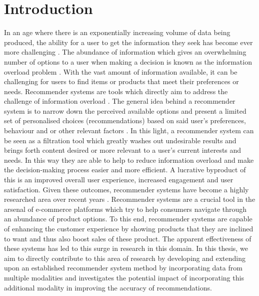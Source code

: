 
\chapter{Introduction} %

\label{Chapter1} %


\newcommand{\keyword}[1]{\textbf{#1}}
\newcommand{\tabhead}[1]{\textbf{#1}}
\newcommand{\code}[1]{\texttt{#1}}
\newcommand{\file}[1]{\texttt{\bfseries#1}}
\newcommand{\option}[1]{\texttt{\itshape#1}}



In an age where there is an exponentially increasing volume of data being produced, the ability for a user to get the information they seek has become ever more challenging \cite{sintef2013bigdata}. The abundance of information which gives an overwhelming number of options to a user when making a decision is known as the information overload problem \cite{bawden2020information}. With the vast amount of information available, it can be challenging for users to find items or products that meet their preferences or needs. Recommender systems are tools which directly aim to address the challenge of information overload \cite{o2005trust}. The general idea behind a recommender system is to narrow down the perceived available options and present a limited set of personalised choices (recommendations) based on said user’s preferences, behaviour and or other relevant factors \cite{o2005trust}. In this light, a recommender system can be seen as a filtration tool which greatly washes out undesirable results and brings forth content desired or more relevant to a user’s current interests and needs. In this way they are able to help to reduce information overload and make the decision-making process easier and more efficient. A lucrative byproduct of this is an improved overall user experience, increased engagement and user satisfaction. Given these outcomes, recommender systems have become a highly researched area over recent years \cite{seth2022comparative}. Recommender systems are a crucial tool in the arsenal of e-commerce platforms which try to help consumers navigate through an abundance of product options. To this end, recommender systems are capable of enhancing the customer experience by showing products that they are inclined to want and thus also boost sales of these product. The apparent effectiveness of these systems has led to this surge in research in this domain. In this thesis, we aim to directly contribute to this area of research by developing and extending upon an established recommender system method by incorporating data from multiple modalities and investigates the potential impact of incorporating this additional modality in improving the accuracy of recommendations. 

